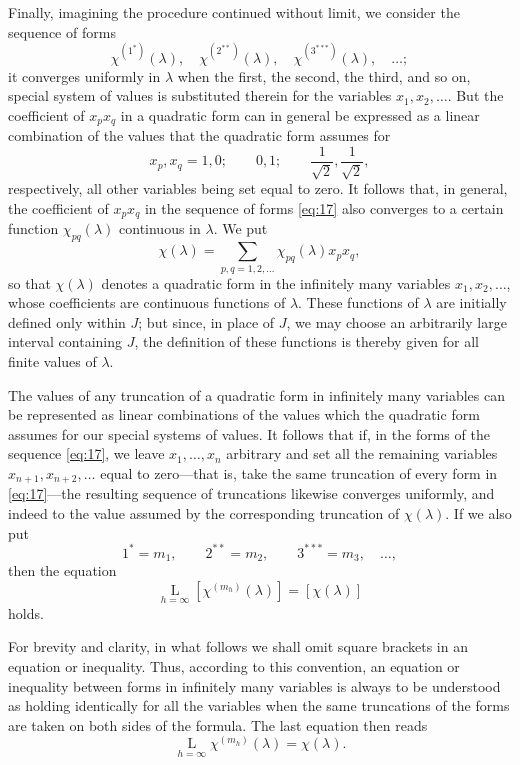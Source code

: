 \documentclass[b5paper,twoside]{article}
\newcommand{\originalpage}[1]{\phantomsection\label{origpage:#1}}
\begin{document}
Finally, imagining the procedure continued without limit, we consider the
sequence of forms
\begin{equation}
\tag{17}\label{eq:17}
  \chi^{(1^*)}(\lambda),\quad
  \chi^{(2^{**})}(\lambda),\quad
  \chi^{(3^{***})}(\lambda),\quad\ldots;
\end{equation}
it converges uniformly in $\lambda$ when the first, the second, the third,
and so on, special system of values is substituted therein for the variables
$x_1,x_2,\ldots$.  But the coefficient of $x_p x_q$ in a quadratic form can
in general be expressed as a linear combination of the values that the
quadratic form assumes for
\[
  x_p,x_q=1,0;\qquad 0,1;\qquad
  \frac1{\sqrt2},\frac1{\sqrt2},
\]
respectively, all other variables being set equal to zero.  It follows that,
in general, the coefficient of $x_p x_q$ in the sequence of forms
\eqref{eq:17} also converges to a certain function
$\chi_{pq}(\lambda)$ continuous in $\lambda$.  We put
\[
  \chi(\lambda)
  =\sum_{p,q=1,2,\ldots}\chi_{pq}(\lambda)x_p x_q,
\]
so that $\chi(\lambda)$ denotes a quadratic form in the infinitely many
variables $x_1,x_2,\ldots$, whose coefficients are continuous functions of
$\lambda$.  These functions of $\lambda$ are initially defined only within
$J$; but since, in place of $J$, we may choose an arbitrarily large interval
containing $J$, the definition of these functions is thereby given for all
finite values of $\lambda$.

The values of any truncation of a quadratic form in infinitely many variables
can be represented as linear combinations of the values which the quadratic
form assumes for our special systems of values.  It follows that if,
\originalpage{167}in the forms of the sequence \eqref{eq:17}, we leave
$x_1,\ldots,x_n$ arbitrary and set all the remaining variables
$x_{n+1},x_{n+2},\ldots$ equal to zero---that is, take the same truncation of
every form in \eqref{eq:17}---the resulting sequence of truncations likewise
converges uniformly, and indeed to the value assumed by the corresponding
truncation of $\chi(\lambda)$.  If we also put
\[
  1^*=m_1,\qquad 2^{**}=m_2,\qquad 3^{***}=m_3,\quad\ldots,
\]
then the equation
\[
  \mathop{\mathrm{L}}\limits_{h=\infty}
  [\chi^{(m_h)}(\lambda)]=[\chi(\lambda)]
\]
holds.

For brevity and clarity, in what follows we shall omit square brackets in an
equation or inequality.  Thus, according to this convention, an equation or
inequality between forms in infinitely many variables is always to be
understood as holding identically for all the variables when the same
truncations of the forms are taken on both sides of the formula.  The last
equation then reads
\begin{equation}
\tag{18}\label{eq:18}
  \mathop{\mathrm{L}}\limits_{h=\infty}
  \chi^{(m_h)}(\lambda)=\chi(\lambda).
\end{equation}
\end{document}
